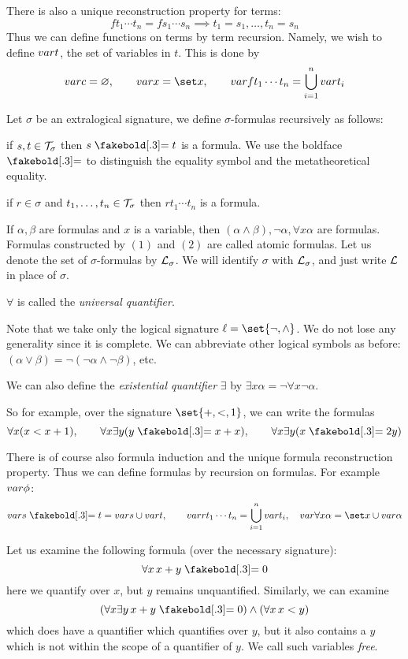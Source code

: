 There is also a unique reconstruction property for terms:
$$ ft_1\cdots t_n = fs_1\cdots s_n \implies t_1=s_1,\dots,t_n=s_n $$
Thus we can define functions on terms by term recursion.
Namely, we wish to define ${\sl var} t$, the set of variables in $t$.
This is done by
$$ \var c=\varnothing,\qquad \var x=\set x,\qquad \var ft_1\cdots t_n=\bigcup_{i=1}^n\var t_i $$

\bdefn

    Let $\sigma$ be an extralogical signature, we define $\sigma$-formulas recursively as follows:
    \benum
        \item if $s,t\in{\cal T}_\sigma$ then $s\eq t$ is a formula.
                We use the boldface $\eq$ to distinguish the equality symbol and the
                metatheoretical equality.
        \item if $r\in\sigma$ and $t_1,\dots,t_n\in{\cal T}_\sigma$ then $rt_1\cdots t_n$ is a
                formula.
        \item If $\alpha,\beta$ are formulas and $x$ is a variable, then $(\alpha\land\beta),
                \neg\alpha,\forall x\alpha$ are formulas.
    \eenum
    Formulas constructed by $(1)$ and $(2)$ are called {\emphcolor atomic formulas}.
    Let us denote the set of $\sigma$-formulas by ${\cal L}_\sigma$.
    We will identify $\sigma$ with ${\cal L}_\sigma$, and just write ${\cal L}$ in place of $\sigma$.

\edefn

$\forall$ is called the {\it universal quantifier}.

Note that we take only the logical signature $\ell=\set{{\neg},{\land}}$.
We do not lose any generality since it is complete.
We can abbreviate other logical symbols as before:
$(\alpha\lor\beta)=\neg(\neg\alpha\land\neg\beta)$, etc.

We can also define the {\it existential quantifier} $\exists$ by
$\exists x\alpha=\neg\forall x\neg\alpha$.

So for example, over the signature $\set{{+},{<},1}$, we can write the formulas
$$ \forall x(x<x+1),\qquad \forall x\exists y(y\eq x+x),\qquad \forall x\exists y(x\eq2y) $$

There is of course also formula induction and the unique formula reconstruction property.
Thus we can define formulas by recursion on formulas.
For example ${\sl var}\phi$:
$$ \var s\eq t = \var s\cup\var t,\qquad \var rt_1\cdots t_n = \bigcup_{i=1}^n\var t_i,
\quad \var\forall x\alpha = \set x\cup\var\alpha $$

Let us examine the following formula (over the necessary signature):
$$ \forall x\,x+y\eq0 $$
here we quantify over $x$, but $y$ remains unquantified.
Similarly, we can examine
$$ (\forall x\exists y\,x+y\eq0)\land(\forall x\,x<y) $$
which does have a quantifier which quantifies over $y$, but it also contains a $y$ which is not
within the scope of a quantifier of $y$.
We call such variables {\it free}.

